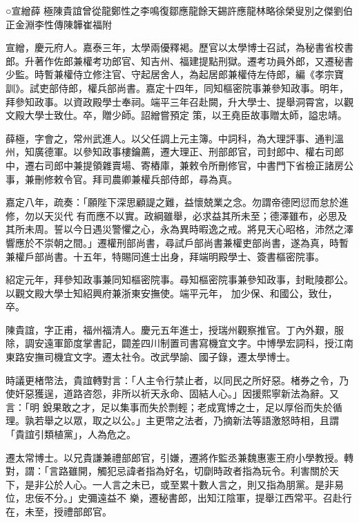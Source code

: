 
\begin{pinyinscope}

 ○宣繒薛
 極陳貴誼曾從龍鄭性之李鳴復鄒應龍餘天錫許應龍林略徐榮叟別之傑劉伯正金淵李性傳陳韡崔福附



 宣繒，慶元府人。嘉泰三年，太學兩優釋褐。歷官以太學博士召試，為秘書省校書郎。升著作佐郎兼權考功郎官、知吉州、福建提點刑獄。遷考功員外郎，又遷秘書少監。時暫兼權侍立修注官、守起居舍人，為起居郎兼權侍左侍郎，編《孝宗寶訓》。試吏部侍郎，權兵部尚書。嘉定十四年，同知樞密院事兼參知政事。明年，拜參知政事。以資政殿學士奉祠。端平三年召赴闕，升大學士、提舉洞霄宮，以觀文殿大學士致仕。卒，贈少師。詔繒嘗預定
 策，以王堯臣故事贈太師，謚忠靖。



 薛極，字會之，常州武進人。以父任調上元主簿。中詞科，為大理評事、通判溫州，知廣德軍。以參知政事樓鑰薦，遷大理正、刑部郎官，司封郎中、權右司郎中，遷右司郎中兼提領雜賣場、寄樁庫，兼敕令所刪修官，中書門下省檢正諸房公事，兼刪修敕令官。拜司農卿兼權兵部侍郎，尋為真。



 嘉定八年，疏奏：「願陛下深思顧諟之難，益懷兢業之念。勿謂帝德罔愆而怠於進修，勿以天災代
 有而應不以實。政綱雖舉，必求益其所未至；德澤雖布，必思及其所未周。誓以今日遇災警懼之心，永為異時暇逸之戒。將見天心昭格，沛然之澤響應於不崇朝之間。」遷權刑部尚書，尋試戶部尚書兼權吏部尚書，遂為真，時暫兼權戶部尚書。十五年，特賜同進士出身，拜端明殿學士、簽書樞密院事。



 紹定元年，拜參知政事兼同知樞密院事。尋知樞密院事兼參知政事，封毗陵郡公。以觀文殿大學士知紹興府兼浙東安撫使。端平元年，
 加少保、和國公，致仕，卒。



 陳貴誼，字正甫，福州福清人。慶元五年進士，授瑞州觀察推官。丁內外艱，服除，調安遠軍節度掌書記，闢差四川制置司書寫機宜文字。中博學宏詞科，授江南東路安撫司機宜文字。遷太社令。改武學諭、國子錄，遷太學博士。



 時議更楮幣法，貴誼轉對言：「人主令行禁止者，以同民之所好惡。楮券之令，乃使奸惡獲逞，道路咨怨，非所以祈天永命、固結人心。」因援熙寧新法為辭。又言：「明
 銳果敢之才，足以集事而失於剽輕；老成寬博之士，足以厚俗而失於循理。孰若舉之以眾，取之以公。」主更幣之法者，乃摘新法等語激怒時相，且謂「貴誼引類植黨」，人為危之。



 遷太常博士。以兄貴謙兼禮部郎官，引嫌，遷將作監丞兼魏惠憲王府小學教授。轉對，謂：「言路雖開，觸犯忌諱者指為好名，切劘時政者指為玩令。利害關於天下，是非公於人心。一人言之未已，或至累十數人言之，則又指為朋黨。是非易位，忠佞不分。」史彌遠益不
 樂，遷秘書郎，出知江陰軍，提舉江西常平。召赴行在，未至，授禮部郎官。




\end{pinyinscope}
